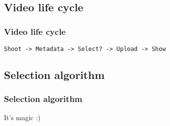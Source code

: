 \subsection{Video life cycle}
\begin{frame}[fragile]	
	\frametitle{Video life cycle}
	\verb|Shoot -> Metadata -> Select? -> Upload -> Show|
\end{frame}
\subsection{Selection algorithm}
\begin{frame}	
	\frametitle{Selection algorithm}
	It's magic :)
\end{frame}